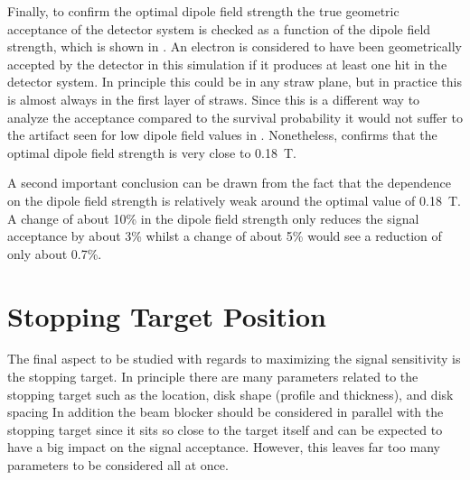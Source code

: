 \FigOptimESTDipoleAcceptanceVsDipole
Finally, to confirm the optimal dipole field strength the true geometric acceptance of the detector system is checked as a function of the dipole field strength, which is shown in .
An electron is considered to have been geometrically accepted by the detector in this simulation if it produces at least one hit in the detector system.
In principle this could be in any straw plane, but in practice this is almost always in the first layer of straws.
Since this is a different way to analyze the acceptance compared to the survival probability it would not suffer to the artifact seen for low dipole field values in .
Nonetheless,  confirms that the optimal dipole field strength is very close to 0.18~T.

A second important conclusion can be drawn from the fact that the dependence on the dipole field strength is relatively weak around the optimal value of 0.18~T.
A change of about 10\% in the dipole field strength only reduces the signal acceptance by about 3\% whilst a change of about 5\% would see a reduction of only about 0.7\%.


\section{Stopping Target Position}
The final aspect to be studied with regards to maximizing the signal sensitivity is the stopping target.
In principle there are many parameters related to the stopping target such as the location, disk shape (profile and thickness), and disk spacing
In addition the beam blocker should be considered in parallel with the stopping target since it sits so close to the target itself and can be expected to have a big impact on the signal acceptance.
However, this leaves far too many parameters to be considered all at once.

